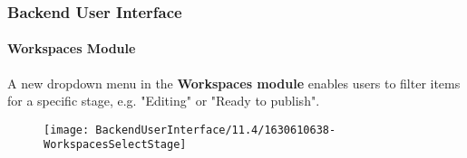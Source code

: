 %

\begin{frame}[fragile]
	\frametitle{Backend User Interface}
	\framesubtitle{Workspaces Module}

	A new dropdown menu in the \textbf{Workspaces module} enables users to filter
	items for a specific stage, e.g. "Editing" or "Ready to publish".

	\begin{figure}
		\texttt{[image: BackendUserInterface/11.4/1630610638-WorkspacesSelectStage]}
	\end{figure}

\end{frame}

